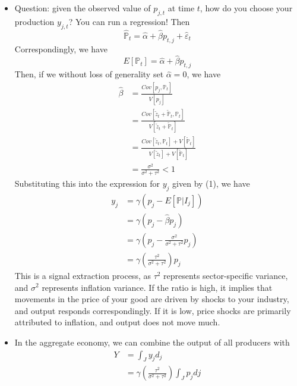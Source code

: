 \documentclass[12pt]{article}
\begin{document}
\begin{itemize}
\begin{itemize}
    \end{itemize}
    \item Question: given the observed value of $p_{j,t}$ at time $t$, how do you choose your production $y_{j,t}$? You can run a regression! Then
    \[\hat{\mathbb{P}}_t = \hat{\alpha} + \hat{\beta}p_{t,j} + \hat{\varepsilon}_t\]
    Correspondingly, we have
    \[E[\mathbb{P}_t] = \hat{\alpha} + \hat{\beta}p_{t,j}\]
    Then, if we without loss of generality set $\hat{\alpha} = 0$, we have
    \[\begin{split}
        \hat{\beta} &= \frac{Cov[p_j, \mathbb{P}_t]}{V[p_j]} \\
        &= \frac{Cov[\widetilde{z}_t + \widetilde{\mathbb{P}}_t, \mathbb{P}_t]}{V[\widetilde{z}_t + \widetilde{\mathbb{P}}_t]} \\
        &= \frac{Cov[\widetilde{z}_t,\mathbb{P}_t] + V[\widetilde{\mathbb{P}}_t]}{V[\widetilde{z}_t] + V[\widetilde{\mathbb{P}}_t]} \\
        &= \frac{\sigma^2}{\sigma^2 + \tau^2} < 1
    \end{split}\]
    Substituting this into the expression for $y_j$ given by (1), we have
    \begin{equation}
        \begin{split}
        y_j &= \gamma\left(p_j - E[\mathbb{P}|I_j]\right) \\
        &= \gamma\left(p_j - \hat{\beta}p_j\right) \\
        &= \gamma\left(p_j - \frac{\sigma^2}{\sigma^2 + \tau^2}p_j\right) \\
        &= \gamma \left(\frac{\tau^2}{\sigma^2 + \tau^2}\right)p_j
    \end{split}
    \end{equation}
    This is a signal extraction process, as $\tau^2$ represents sector-specific variance, and $\sigma^2$ represents inflation variance. If the ratio is high, it implies that movements in the price of your good are driven by shocks to your industry, and output responds correspondingly. If it is low, price shocks are primarily attributed to inflation, and output does not move much.
    \item In the aggregate economy, we can combine the output of all producers with
    \begin{equation}
        \begin{split}
            Y &= \int_Jy_jd_j \\
            &= \gamma \left(\frac{\tau^2}{\sigma^2 + \tau^2}\right)\int_Jp_jdj \\

\end{split}
\end{equation}
\end{itemize}
\end{document}
